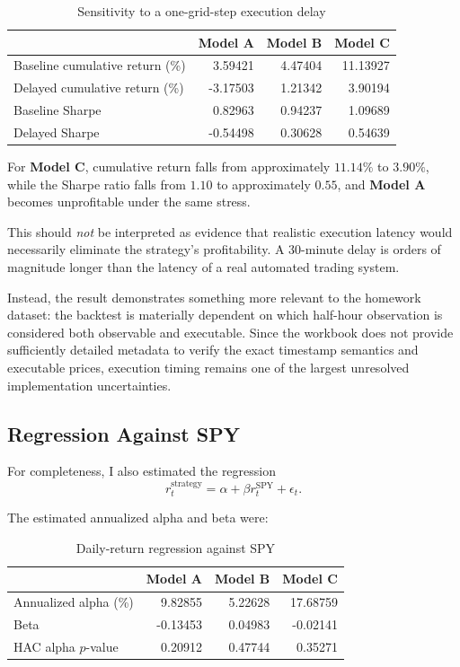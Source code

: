 \documentclass{article}
\begin{document}
\begin{table}[H]
\centering
\caption{Sensitivity to a one-grid-step execution delay}
\label{tab:delay}
\begin{tabular}{lrrr}
\toprule
 &\textbf{ Model A} &\textbf{ Model B} &\textbf{ Model C} \\
\midrule
Baseline cumulative return (\%) 
    & 3.59421 & 4.47404 & 11.13927 \\
Delayed cumulative return (\%)  
    & -3.17503 & 1.21342 & 3.90194 \\
Baseline Sharpe                  
    & 0.82963 & 0.94237 & 1.09689 \\
Delayed Sharpe                   
    & -0.54498 & 0.30628 & 0.54639 \\
\bottomrule
\end{tabular}
\end{table}

For\textbf{ Model C}, cumulative return falls from approximately \(11.14\%\) to \(3.90\%\), while the Sharpe ratio falls from \(1.10\) to approximately \(0.55\), and\textbf{ Model A} becomes unprofitable under the same stress.

This should \emph{not} be interpreted as evidence that realistic execution latency would necessarily eliminate the strategy's profitability. A 30-minute delay is orders of magnitude longer than the latency of a real automated trading system.

Instead, the result demonstrates something more relevant to the homework dataset: the backtest is materially dependent on which half-hour observation is considered both observable and executable. Since the workbook does not provide sufficiently detailed metadata to verify the exact timestamp semantics and executable prices, execution timing remains one of the largest unresolved implementation uncertainties.

\subsection{Regression Against SPY}

For completeness, I also estimated the regression
\begin{equation}
    r^{\text{strategy}}_t
    =
    \alpha
    +
    \beta r^{\text{SPY}}_t
    +
    \epsilon_t.
\end{equation}

The estimated annualized alpha and beta were:

\begin{table}[H]
\centering
\caption{Daily-return regression against SPY}
\label{tab:regression}
\begin{tabular}{lrrr}
\toprule
 &\textbf{ Model A} &\textbf{ Model B} &\textbf{ Model C} \\
\midrule
Annualized alpha (\%) & 9.82855 & 5.22628 & 17.68759 \\
Beta                  & -0.13453 & 0.04983 & -0.02141 \\
HAC alpha $p$-value   & 0.20912 & 0.47744 & 0.35271 \\
\bottomrule
\end{tabular}
\end{table}
\end{document}
